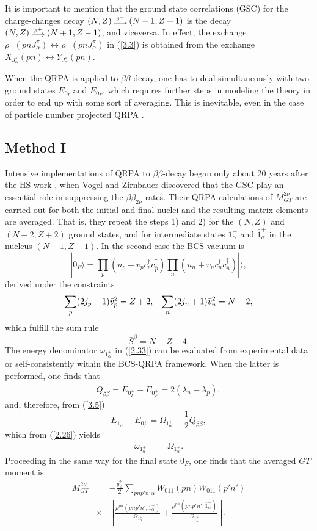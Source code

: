 \documentclass[nofootinbib,twocolumn,eqsecnum,floats,aps]{revtex4}
\def\upb{\bar{u}_p}
\def\vpb{\bar{v}_p}
\def\unb{\bar{u}_n}
\def\vnb{\bar{v}_n}
\def\sss{\scriptscriptstyle}
\def\nn{\nonumber }
\def\x{\times}
\def\nn{\nonumber }
\def\be{\begin{equation}}
\def\ee{\end{equation}}
\def\br{\begin{eqnarray}}
\def\er{\end{eqnarray}}
\def\ket#1{|#1 \rangle}
\def\rf#1{{(\ref{#1})}}
\def\fot{\frac{1}{2}}
\def\a {{\alpha}}
\def\b {{\beta}}
\def\sss{\scriptscriptstyle}
\def\bp{\:\raisebox{-.5ex}{$\stackrel{{\mbox {\tiny $\beta^+$}}}
{{\textstyle\longrightarrow}}$}\:}
\def\bn{\:\raisebox{-.5ex}{$\stackrel{{\mbox {\tiny $\beta^-$}}}
{{\textstyle\longrightarrow}}$}\:}
\begin{document}
It is important to mention that the  ground state correlations (GSC) for the charge-changes
decay $(N,Z)\bn (N-1,Z+1)$  is the decay  $(N,Z)\bp (N+1,Z-1)$,  and vice\-versa.
In effect, the exchange $\rho^{-}(pnJ_\a^\pi)\leftrightarrow \rho^{+}(pnJ_\a^\pi)$  in \rf{3.3}
is obtained from the exchange $X_{J_\a^\pi}(pn)\leftrightarrow  Y_{J_\a^\pi}(pn)$.

When  the QRPA is applied to $\b\b$-decay, one has to deal simultaneously
with two ground states $E_{0_I}$ and $E_{0_F}$,  which
requires further steps in modeling the theory
in order to end up  with some sort of averaging.
This is inevitable, even in the case of particle number projected QRPA \cite{Krm93}.
%
\bigskip
\subsection {Method I}\label{Sec3A}

Intensive implementations of QRPA to $\b\b$-decay began only about 20 years
after the HS work \cite{Hal67}, when  Vogel and Zirnbauer  \cite{Vog86} discovered
that the GSC play an essential role in suppressing
the $\b\b_{2\nu}$ rates.  Their QRPA calculations of $M_{ GT}^{2\nu}$ are carried
out for both the initial and final nuclei and the resulting matrix elements are averaged.
That is, they repeat the steps 1) and 2)
for the  $(N,Z)$ and $(N-2,Z+2)$ ground states, and for intermediate
states $1^+_\a$ and ${\bar 1}^+_{\a}$ in the nucleus $(N-1,Z+1)$. In the second case
the BCS vacuum is
\be
\ket{0_F}=\prod_p(\upb+\vpb c_p^\dag c_{\bar p}^\dag)\prod_n(\unb+\vnb c_n^\dag c_{\bar n}^\dag)\ket{},
\label{3.7} \ee
derived under the constraints
\be
\sum_{p}(2j_p+1) \vpb^2=Z+2,\hspace{0.3cm}\sum_{n}(2j_n+1) \vnb^2=N-2,
\label{3.8} \ee
which fulfill the sum rule
\be
{ \bar S}^{\b}=N-Z-4.
\label{3.9}\ee
The energy denominator $\omega_{1^+_\a}$ in \rf{2.33} can be evaluated from experimental data or self-consistently within the BCS-QRPA framework.
When the latter is performed, one finds that
\cite[Sec. 6.3.4]{Ri80}
\br
Q_{\b\b}=E_{0^+_I}-E_{0^+_F}=2(\lambda_n-\lambda_p),
\label{3.10}
\er
and, therefore,
 from \rf{3.5}
\be
E_{1_\a^+}-E_{0^+_I}=\Omega _{1^+_{\a}}-\fot Q_{\b\b},
\label{3.11}\ee
which from \rf{2.26} yields
\br
\omega_{1^+_\a}&=&\Omega _{1^+_{\a}}.
\label{3.12}\er
Proceeding in the same way for the  final state $0_F$, one
finds
 that the averaged $GT$ moment is:
\br
M_{ GT}^{2\nu}&=&-\frac{g_{\sss A}^2}{2}\sum_{pnp'n'\a}W_{011}(pn) W_{011}(p'n')
\nn\\
&\x&\left[\frac{\rho^{ph}(pnp'n';1_\a^+)}{\Omega_{1^+_\a}}+
\frac{\rho^{ph}(pnp'n';{\bar 1}_\a^+)}{\Omega_{{\bar 1}^+_\a}}\right].
\nn\\
\label{3.13}
\end{eqnarray}
\end{document}
